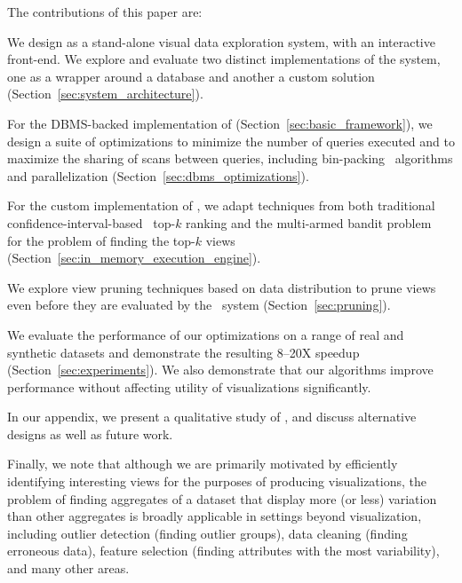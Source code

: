 The contributions of this paper are:
\begin{denselist}
  \item We design \SeeDB as a stand-alone visual data exploration system,
  with an interactive front-end. We explore and evaluate two distinct implementations of the system, one as a
  wrapper around a database and another a custom solution (Section~\ref{sec:system_architecture}).
  \item For the DBMS-backed implementation of \SeeDB (Section~\ref{sec:basic_framework}), we
  design a suite of optimizations to minimize the number of queries executed and to
  maximize the sharing of scans between queries, 
  including bin-packing~\cite{garey} algorithms and parallelization
  (Section~\ref{sec:dbms_optimizations}).
  \item For the custom implementation of \SeeDB,  we adapt techniques 
  from both traditional confidence-interval-based~\cite{hoeffding1963probability} top-$k$ ranking and the
   multi-armed bandit problem~\cite{bandits} 
   for the problem of finding the top-$k$ views (Section~\ref{sec:in_memory_execution_engine}).
  \item We explore view pruning techniques based on data distribution
  to prune views even before they are evaluated by the \SeeDB\ system 
  (Section~\ref{sec:pruning}).
  \item We evaluate the performance of our optimizations on a range of
  real and synthetic datasets and demonstrate the resulting 8--20X speedup 
  (Section~\ref{sec:experiments}). We also demonstrate that our algorithms
  improve performance without affecting utility of visualizations significantly.
\end{denselist}
In our appendix, we present a qualitative study of \SeeDB, 
and discuss alternative designs as well as future work.

Finally, we note that although we are primarily motivated by efficiently 
identifying interesting views for the purposes of producing visualizations, 
the problem of finding aggregates of a dataset that display more (or less) variation
than other aggregates is broadly applicable in settings beyond visualization, including
outlier detection (finding outlier groups), data cleaning (finding erroneous 
data), feature selection (finding attributes with the most variability), and 
many other areas.






